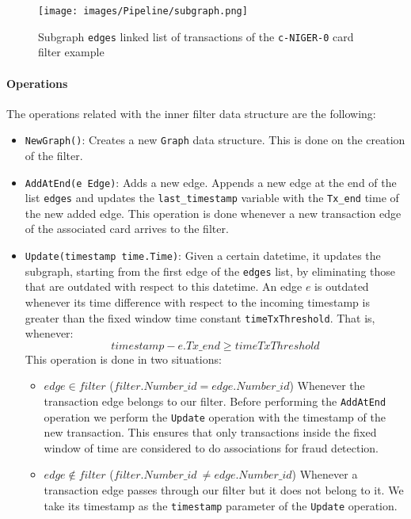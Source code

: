 \begin{graysection}
\begin{figure}[H]
    \centering
    \texttt{[image: images/Pipeline/subgraph.png]}
    \caption{Subgraph \texttt{edges} linked list of transactions of the \texttt{c-NIGER-0} card filter example}
    \label{img:pipeline-subgraph}
\end{figure}

\paragraph{Operations}
The operations related with the inner filter data structure are the following:

\begin{itemize}
    \item \texttt{NewGraph()}: Creates a new \texttt{Graph} data structure. This is done on the creation of the filter.
    
    \item \texttt{AddAtEnd(e Edge)}: Adds a new edge. Appends a new edge at the end of the list \texttt{edges} and updates the \texttt{last\_timestamp} variable with the \texttt{Tx\_end} time of the new added edge. This operation is done whenever a new transaction edge of the associated card arrives to the filter.
    
    \item \texttt{Update(timestamp time.Time)}: Given a certain datetime, it updates the subgraph, starting from the first edge of the \texttt{edges} list, by eliminating those that are outdated with respect to this datetime. An edge $e$ is outdated  whenever its time difference with respect to the incoming timestamp is greater than the fixed window time constant \texttt{timeTxThreshold}. That is, whenever: $$timestamp - e.Tx\_end \geq timeTxThreshold$$
    This operation is done in two situations:
    \begin{itemize}
        \item $edge \in filter$ ($filter.Number\_id = edge.Number\_id$) Whenever the transaction edge belongs to our filter. Before performing the \texttt{AddAtEnd} operation we perform the \texttt{Update} operation with the timestamp of the new transaction. This ensures that only transactions inside the fixed window of time are considered to do associations for fraud detection. 
        \item $edge \notin filter$ ($filter.Number\_id\ \neq edge.Number\_id$) Whenever a transaction edge passes through our filter but it does not belong to it. We take its timestamp as the \texttt{timestamp} parameter of the \texttt{Update} operation.
    \end{itemize}
    

\end{itemize}
\end{graysection}
